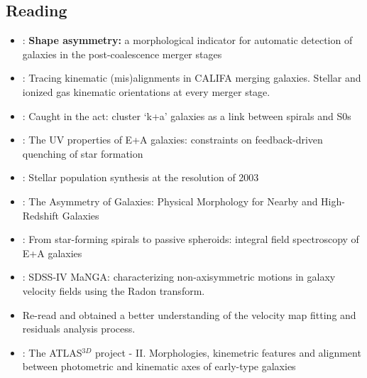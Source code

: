 \subsection{Reading}
\begin{itemize}
    \item \citet{10.1093/mnras/stv2878} : {\textbf{Shape asymmetry:} a morphological indicator for automatic detection of galaxies in the post-coalescence merger stages}
    \item \citet{2015A&A...582A..21B} : {Tracing kinematic (mis)alignments in CALIFA merging galaxies. Stellar and ionized gas kinematic orientations at every merger stage}.
    \item \citet{2014MNRAS.438.1038R}: {Caught in the act: cluster `k+a' galaxies as a link between spirals and S0s}
    \item \citet{2007MNRAS.382..960K} : {The UV properties of E+A galaxies: constraints on feedback-driven quenching of star formation}
    \item \citet{2003MNRAS.344.1000B} : {Stellar population synthesis at the resolution of 2003}
    \item \citet{2000ApJ...529..886C} : {The Asymmetry of Galaxies: Physical Morphology for Nearby and High-Redshift Galaxies}
    \item \citet{2012MNRAS.420..672S} : {From star-forming spirals to passive spheroids: integral field spectroscopy of E+A galaxies}
    \item \citet{2018MNRAS.480.2217S} : {SDSS-IV MaNGA: characterizing non-axisymmetric motions in galaxy velocity fields using the Radon transform}.
    \item Re-read \citet{2006MNRAS.366..787K} and obtained a better understanding of the velocity map fitting and residuals analysis process.
    \item \citet{2011MNRAS.414.2923K} : {The ATLAS$^{3D}$ project - II. Morphologies, kinemetric features and alignment between photometric and kinematic axes of early-type galaxies}
\end{itemize}